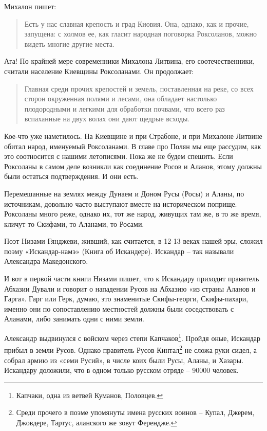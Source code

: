 Михалон пишет:

\begin{quotation} 
Есть у нас славная крепость и град Киовия. Она, однако, как и прочие, запущена: с холмов ее, как гласит народная поговорка Роксоланов, можно видеть многие другие места.
\end{quotation} 

Ага! По крайней мере современники Михалона Литвина, его соотечественники, считали население Киевщины Роксоланами. Он продолжает:

\begin{quotation} 
Главная среди прочих крепостей и земель, поставленная на реке, со всех сторон окруженная полями и лесами, она обладает настолько плодородными и легкими для обработки почвами, что всего раз вспаханные на двух волах они дают щедрые всходы.
\end{quotation} 

Кое-что уже наметилось. На Киевщине и при Страбоне, и при Михалоне Литвине обитал народ, именуемый Роксоланами. В главе про Полян мы еще рассудим, как это соотносится с нашими летописями. Пока же не будем спешить. Если Роксоланы в самом деле возникли как соединение Росов и Аланов, этому должны были остаться подтверждения. И они есть.

Перемешанные на землях между Дунаем и Доном Русы (Росы) и Аланы, по источникам, довольно часто выступают вместе на историческом поприще. Роксоланы много реже, однако их, тот же народ, живущих там же, в то же время, кличут то Скифами, то Аланами, то Росами.

Поэт Низами Гянджеви, живший, как считается, в 12-13 веках нашей эры, сложил поэму «Искандар-намэ» (Книга об Искандере). Искандар – так называли Александра Македонского.

И вот в первой части книги Низами пишет, что к Искандару приходит правитель Абхазии Дували и говорит о нападении Русов на Абхазию «из страны Аланов и Гарга». Гарг или Герк, думаю, это знаменитые Скифы-георги, Скифы-пахари, именно они по сопоставлению местностей должны были соседствовать с Аланами, либо занимать одни с ними земли.

Александр выдвинулся с войском через степи Капчаков\footnote{Капчаки, одна из ветвей Куманов, Половцев.}. Пройдя оные, Искандар прибыл в земли Русов. Однако правитель Русов Кинтал\footnote{Среди прочего в поэме упомянуты имена русских воинов – Купал, Джерем, Джовдере, Тартус, аланского же зовут Ферендже.} не сложа руки сидел, а собрал армию из «семи Русий», в числе коих были Русы, Аланы, и Хазары. Искандару доложили, что в одном только русском отряде – 90000 человек.

